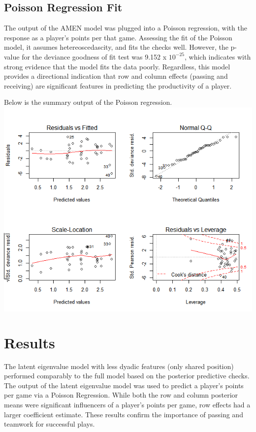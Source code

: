 \documentclass[12pt,twoside]{dukestatscithesis}
\theoremstyle{definition}
\theoremstyle{definition}
\theoremstyle{definition}
\theoremstyle{remark}
\begin{document}
\subsection{Poisson Regression Fit}\label{poisson-regression-fit}

The output of the AMEN model was plugged into a Poisson regression, with
the response as a player's points per that game. Assessing the fit of
the Poisson model, it assumes hetereoscedascity, and fits the checks
well. However, the p-value for the deviance goodness of fit test was
9.152 x \(10^{-25}\), which indicates with strong evidence that the
model fits the data poorly. Regardless, this model provides a
directional indication that row and column effects (passing and
receiving) are significant features in predicting the productivity of a
player.

Below is the summary output of the Poisson regression.
\includegraphics{img/poissonsummary2.png}

\section{Results}\label{results-1}

The latent eigenvalue model with less dyadic features (only shared
position) performed comparably to the full model based on the posterior
predictive checks. The output of the latent eigenvalue model was used to
predict a player's points per game via a Poisson Regression. While both
the row and column posterior means were significant influencers of a
player's points per game, row effects had a larger coefficient estimate.
These results confirm the importance of passing and teamwork for
successful plays.
\end{document}
